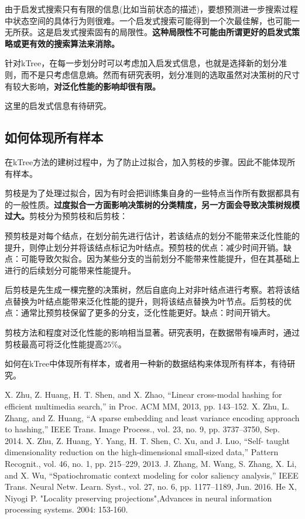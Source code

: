 \documentclass{ctexart}
\begin{document}
	由于启发式搜索只有有限的信息(比如当前状态的描述)，要想预测进一步搜索过程中状态空间的具体行为则很难。一个启发式搜索可能得到一个次最佳解，也可能一无所获。这是启发式搜索固有的局限性。{\bfseries 这种局限性不可能由所谓更好的启发式策略或更有效的搜索算法来消除。}
	
	针对kTree，在每一步划分时可以考虑加入启发式信息，也就是选择新的划分准则，而不是只考虑信息熵。然而有研究表明，划分准则的选取虽然对决策树的尺寸有较大影响，{\bfseries 对泛化性能的影响却很有限。}
	
	这里的启发式信息有待研究。
	\subsection{如何体现所有样本}
	在kTree方法的建树过程中，为了防止过拟合，加入剪枝的步骤。因此不能体现所有样本。
	
	剪枝是为了处理过拟合，因为有时会把训练集自身的一些特点当作所有数据都具有的一般性质。{\bfseries 过度拟合一方面影响决策树的分类精度，另一方面会导致决策树规模过大。}剪枝分为预剪枝和后剪枝：
	
	预剪枝是对每个结点，在划分前先进行估计，若该结点的划分不能带来泛化性能的提升，则停止划分并将该结点标记为叶结点。预剪枝的优点：减少时间开销。缺点：可能导致欠拟合。因为某些分支的当前划分不能带来性能提升，但在其基础上进行的后续划分可能带来性能提升。
	
	后剪枝是先生成一棵完整的决策树，然后自底向上对非叶结点进行考察。若将该结点替换为叶结点能带来泛化性能的提升，则将该结点替换为叶节点。后剪枝的优点：通常比预剪枝保留了更多的分支，泛化性能更好。缺点：时间开销大。
	
	剪枝方法和程度对泛化性能的影响相当显著。研究表明，在数据带有噪声时，通过剪枝最高可将泛化性能提高$ 25\% $。
	
	如何在kTree中体现所有样本，或者用一种新的数据结构来体现所有样本，有待研究。
	
	\begin{thebibliography}{99}
		X. Zhu, Z. Huang, H. T. Shen, and X. Zhao, “Linear cross-modal hashing
		for efficient multimedia search,” in Proc. ACM MM, 2013, pp. 143–152.
		X. Zhu, L. Zhang, and Z. Huang, “A sparse embedding and least variance
		encoding approach to hashing,” IEEE Trans. Image Process., vol. 23,
		no. 9, pp. 3737–3750, Sep. 2014.
		X. Zhu, Z. Huang, Y. Yang, H. T. Shen, C. Xu, and J. Luo, “Self-
		taught dimensionality reduction on the high-dimensional small-sized
		data,” Pattern Recognit., vol. 46, no. 1, pp. 215–229, 2013.
		 J. Zhang, M. Wang, S. Zhang, X. Li, and X. Wu, “Spatiochromatic
		context modeling for color saliency analysis,” IEEE Trans. Neural Netw.
		Learn. Syst., vol. 27, no. 6, pp. 1177–1189, Jun. 2016.
		He X, Niyogi P. "Locality preserving projections",Advances in neural information processing systems. 2004: 153-160.
	\end{thebibliography}
\end{document}
